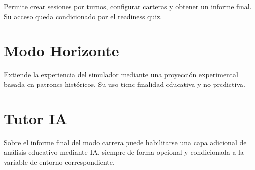 Permite crear sesiones por turnos, configurar carteras y obtener un informe final. Su acceso queda condicionado por el readiness quiz.

\section{Modo Horizonte}

Extiende la experiencia del simulador mediante una proyección experimental basada en patrones históricos. Su uso tiene finalidad educativa y no predictiva.

\section{Tutor IA}

Sobre el informe final del modo carrera puede habilitarse una capa adicional de análisis educativo mediante IA, siempre de forma opcional y condicionada a la variable de entorno correspondiente.
